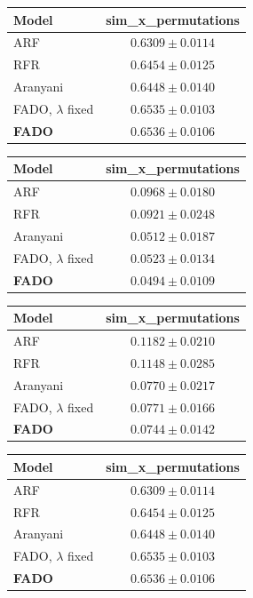 \begin{tabular}{lc}
\toprule
\textbf{Model} & sim\_x\_permutations \\
\midrule
ARF & $0.6309 \pm 0.0114$ \\
RFR & $0.6454 \pm 0.0125$ \\
Aranyani & $0.6448 \pm 0.0140$ \\
FADO, $\lambda$ fixed & $0.6535 \pm 0.0103$ \\
\textbf{FADO} & $0.6536 \pm 0.0106$ \\
\bottomrule
\end{tabular}

\begin{tabular}{lc}
\toprule
\textbf{Model} & sim\_x\_permutations \\
\midrule
ARF & $0.0968 \pm 0.0180$ \\
RFR & $0.0921 \pm 0.0248$ \\
Aranyani & $0.0512 \pm 0.0187$ \\
FADO, $\lambda$ fixed & $0.0523 \pm 0.0134$ \\
\textbf{FADO} & $0.0494 \pm 0.0109$ \\
\bottomrule
\end{tabular}

\begin{tabular}{lc}
\toprule
\textbf{Model} & sim\_x\_permutations \\
\midrule
ARF & $0.1182 \pm 0.0210$ \\
RFR & $0.1148 \pm 0.0285$ \\
Aranyani & $0.0770 \pm 0.0217$ \\
FADO, $\lambda$ fixed & $0.0771 \pm 0.0166$ \\
\textbf{FADO} & $0.0744 \pm 0.0142$ \\
\bottomrule
\end{tabular}

\begin{tabular}{lc}
\toprule
\textbf{Model} & sim\_x\_permutations \\
\midrule
ARF & $0.6309 \pm 0.0114$ \\
RFR & $0.6454 \pm 0.0125$ \\
Aranyani & $0.6448 \pm 0.0140$ \\
FADO, $\lambda$ fixed & $0.6535 \pm 0.0103$ \\
\textbf{FADO} & $0.6536 \pm 0.0106$ \\
\bottomrule
\end{tabular}

